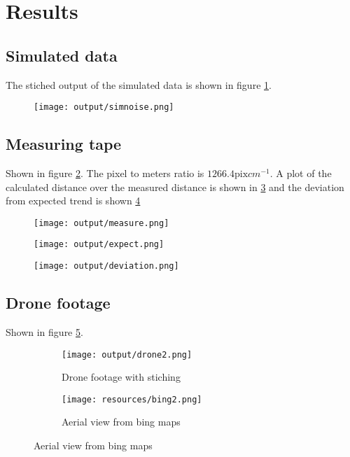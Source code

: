 \section{Results}
\subsection{Simulated data}

The stiched output of the simulated data is shown in figure \ref{fig:simnoise}.

\begin{figure}
  \centering
  \texttt{[image: output/simnoise.png]}
  \caption{}
  \label{fig:simnoise}
\end{figure}

\subsection{Measuring tape}

Shown in figure \ref{fig:measure}.
The pixel to meters ratio is $1266.4 \text{pix} cm^{-1}$.
A plot of the calculated distance over the measured distance is shown in \ref{fig:expect}
and the deviation from expected trend is shown \ref{fig:deviation}

\begin{figure}
  \centering
  \texttt{[image: output/measure.png]}
  \caption{}
  \label{fig:measure}
\end{figure}

\begin{figure}
  \centering
  \texttt{[image: output/expect.png]}
  \caption{}
  \label{fig:expect}
\end{figure}

\begin{figure}
  \centering
  \texttt{[image: output/deviation.png]}
  \caption{}
  \label{fig:deviation}
\end{figure}

\subsection{Drone footage}

Shown in figure \ref{fig:drone}.

\begin{figure}
  \centering
  \begin{subfigure}[b]{0.5\textwidth}
    \texttt{[image: output/drone2.png]}
    \caption{Drone footage with stiching}
    \label{fig:drone}
  \end{subfigure}
  \begin{subfigure}[b]{0.5\textwidth}
    \texttt{[image: resources/bing2.png]}
    \caption{Aerial view from bing maps}
    \label{fig:bing}
  \end{subfigure}
\end{figure}


